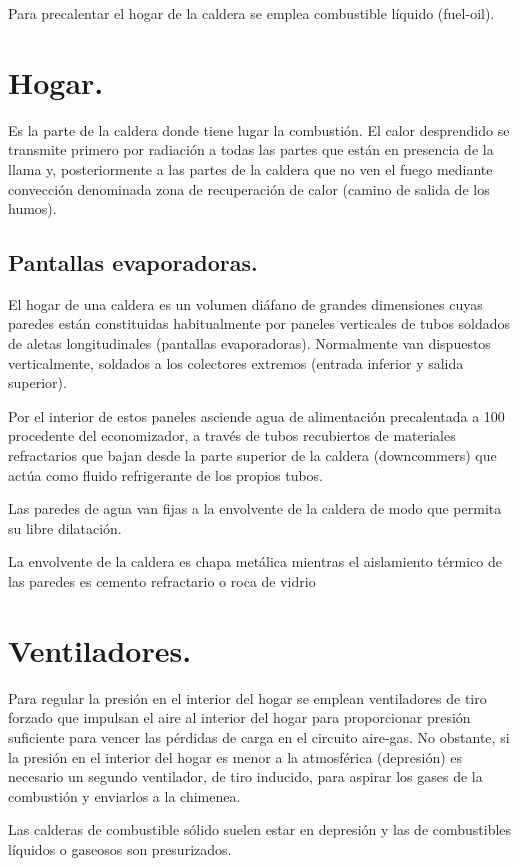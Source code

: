 Para precalentar el hogar de la caldera se emplea combustible líquido (fuel-oil).
\section{Hogar.}
Es la parte de la caldera donde tiene lugar la combustión. El calor desprendido se transmite primero por radiación a todas las partes que están en presencia de la llama y, posteriormente a las partes de la caldera que no ven el fuego mediante convección denominada zona de recuperación de calor (camino de salida de los humos).
\subsection{Pantallas evaporadoras.}
El hogar de una caldera es un volumen diáfano de grandes dimensiones cuyas paredes están
constituidas habitualmente por paneles verticales de tubos soldados de aletas longitudinales
(pantallas evaporadoras). Normalmente van dispuestos verticalmente, soldados a los colectores
extremos (entrada inferior y salida superior).




Por el interior de estos paneles asciende agua de alimentación precalentada a 100\grado $\ $ procedente del economizador, a través de tubos recubiertos de materiales refractarios que bajan desde la parte superior de la caldera (downcommers) que actúa como fluido refrigerante de los propios tubos.


Las paredes de agua van fijas a la envolvente de la caldera de modo que permita su libre
dilatación. 


La envolvente de la caldera es chapa metálica mientras el aislamiento térmico de las paredes
es cemento refractario o roca de vidrio
\section{Ventiladores.}
Para regular la presión en el interior del hogar se emplean ventiladores de tiro forzado que impulsan el aire al interior del hogar para proporcionar presión suficiente para vencer las pérdidas de carga en el circuito aire-gas. No obstante, si la presión en el interior del hogar es menor a la atmosférica (depresión) es necesario un segundo ventilador, de tiro inducido, para aspirar los gases de la combustión y enviarlos a la chimenea.



Las calderas de combustible sólido suelen estar en depresión y las de combustibles líquidos o gaseosos son presurizados.
